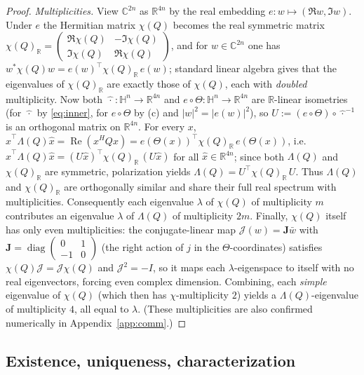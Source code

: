 \documentclass{amsart}
\theoremstyle{definition}
\newcommand{\HH}{\mathbb{H}}
\newcommand{\RR}{\mathbb{R}}
\newcommand{\CC}{\mathbb{C}}
\newcommand{\Real}{\operatorname{Re}}
\newcommand{\diag}{\operatorname{diag}}
\begin{document}
\begin{proof}
\emph{Multiplicities.} View $\CC^{2n}$ as $\RR^{4n}$ by the real
embedding $e\colon w\mapsto(\Re w,\Im w)$. Under $e$ the Hermitian
matrix $\chi(Q)$ becomes the real symmetric matrix
$\chi(Q)_\RR=\left(\begin{smallmatrix}\Re\chi(Q)&-\Im\chi(Q)\\
\Im\chi(Q)&\Re\chi(Q)\end{smallmatrix}\right)$, and for $w\in\CC^{2n}$ one
has $w^*\chi(Q)w=e(w)^{\top}\chi(Q)_\RR\,e(w)$; standard linear algebra
gives that the eigenvalues of $\chi(Q)_\RR$ are exactly those of
$\chi(Q)$, each with \emph{doubled} multiplicity. Now both
$\widehat{\,\cdot\,}\colon\HH^n\to\RR^{4n}$ and
$e\circ\Theta\colon\HH^n\to\RR^{4n}$ are $\RR$-linear isometries (for
$\widehat{\,\cdot\,}$ by \eqref{eq:inner}, for $e\circ\Theta$ by (c) and
$|w|^2=|e(w)|^2$), so
$U:=(e\circ\Theta)\circ\widehat{\,\cdot\,}^{-1}$ is an orthogonal matrix
on $\RR^{4n}$. For every $x$,
$\widehat x^{\top}\Lambda(Q)\widehat x=\Real(x^HQx)
=e(\Theta(x))^{\top}\chi(Q)_\RR\,e(\Theta(x))$, i.e.
$\widehat x^{\top}\Lambda(Q)\widehat x
=(U\widehat x)^{\top}\chi(Q)_\RR\,(U\widehat x)$ for all
$\widehat x\in\RR^{4n}$; since both $\Lambda(Q)$ and $\chi(Q)_\RR$ are
symmetric, polarization yields
$\Lambda(Q)=U^{\top}\chi(Q)_\RR\,U$. Thus $\Lambda(Q)$ and
$\chi(Q)_\RR$ are orthogonally similar and share their full real
spectrum with multiplicities. Consequently each eigenvalue $\lambda$ of
$\chi(Q)$ of multiplicity $m$ contributes an eigenvalue $\lambda$ of
$\Lambda(Q)$ of multiplicity $2m$. Finally, $\chi(Q)$ itself has only even
multiplicities: the conjugate-linear map
$\mathcal J(w)=\mathbf J\bar w$ with
$\mathbf J=\diag\!\left(\begin{smallmatrix}0&1\\-1&0\end{smallmatrix}\right)$
(the right action of $j$ in the $\Theta$-coordinates) satisfies
$\chi(Q)\mathcal J=\mathcal J\chi(Q)$ and $\mathcal J^2=-I$, so it maps
each $\lambda$-eigenspace to itself with no real eigenvectors, forcing
even complex dimension. Combining, each \emph{simple} eigenvalue of
$\chi(Q)$ (which then has $\chi$-multiplicity $2$) yields a
$\Lambda(Q)$-eigenvalue of multiplicity $4$, all equal to $\lambda$.
(These multiplicities are also confirmed numerically in
Appendix~\ref{app:comm}.)
\end{proof}

\subsection{Existence, uniqueness, characterization}
\end{document}
